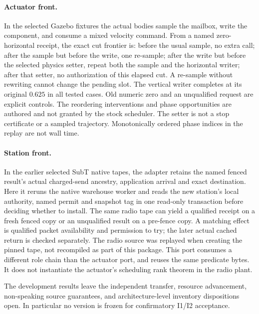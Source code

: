 \documentclass{article}
\begin{document}
\paragraph{Actuator front.}
In the selected Gazebo fixtures the actual bodies sample the mailbox,
write the component, and consume a mixed velocity command. From
a named zero-horizontal receipt, the exact cut frontier is:
before the usual sample, no extra call; after the sample but before
the write, one re-sample; after the write but before the selected
physics setter, repeat both the sample and the horizontal writer;
after that setter, no authorization of this elapsed cut. A re-sample
without rewriting cannot change the pending slot. The vertical
writer completes at its original $0.625$ in all tested cases.
Old numeric zero and an unqualified request are explicit controls.
The reordering interventions and phase opportunities are authored
and not granted by the stock scheduler. The setter is not a stop
certificate or a sampled trajectory. Monotonically ordered phase
indices in the replay are not wall time.

\paragraph{Station front.}
In the earlier selected SubT native tapes, the adapter retains
the named fenced result's actual charged-send ancestry, application
arrival and exact destination. Here it reruns the native warehouse
worker and reads the new station's local authority, named permit
and snapshot tag in one read-only transaction before deciding
whether to install. The same radio tape can yield a qualified
receipt on a fresh fenced copy or an unqualified result on a
pre-fence copy. A matching effect is qualified packet availability
and permission to try; the later actual cached return is checked
separately. The radio source was replayed when creating the pinned
tape, not recompiled as part of this package. This port consumes a
different role chain than the actuator port, and reuses the same
predicate bytes. It does not instantiate the actuator's scheduling
rank theorem in the radio plant.

The development results leave the independent transfer, resource
advancement, non-speaking source guarantees, and architecture-level
inventory dispositions open. In particular no version is frozen
for confirmatory I1/I2 acceptance.
\end{document}
